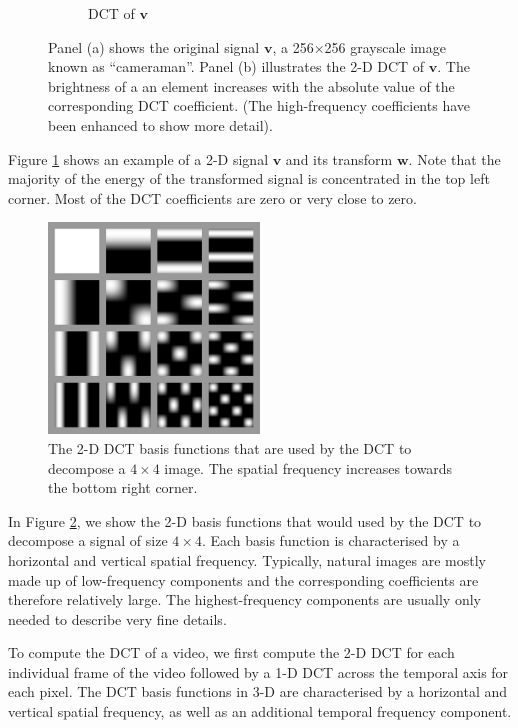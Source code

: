 \begin{figure}
\begin{subfigure}{0.45\textwidth}
    \caption{DCT of $\bm v$}
  \end{subfigure}
  \caption[Two-dimensional DCT applied to a digital image]{Panel (a) shows the original signal $\bm v$, a 256$\times$256 grayscale image known as ``cameraman''. Panel (b) illustrates the 2-D DCT of $\bm v$. The brightness of a an element increases with the absolute value of the corresponding DCT coefficient. (The high-frequency coefficients have been enhanced to show more detail).}
  \label{fig:ch3:dct}
\end{figure}

Figure \ref{fig:ch3:dct} shows an example of a 2-D signal $\bm v$ and its transform $\bm w$.
Note that the majority of the energy of the transformed signal is concentrated in the top left corner.
Most of the DCT coefficients are zero or very close to zero.

\begin{figure}
  \centering
  \includegraphics[width=0.5\textwidth]{Chapter3/Images/dct2functions.png}
  \caption[The 2-D DCT basis functions]{The 2-D DCT basis functions that are used by the DCT to decompose a $4\times 4$ image. 
    The spatial frequency increases towards the bottom right corner.}
  \label{fig:2D-DCT}
\end{figure}

In Figure \ref{fig:2D-DCT}, we show the 2-D basis functions that would used by the DCT to decompose a signal of size $4\times 4$.
Each basis function is characterised by a horizontal and vertical spatial frequency.
Typically, natural images are mostly made up of low-frequency components and the corresponding coefficients are therefore relatively large.
The highest-frequency components are usually only needed to describe very fine details.

To compute the DCT of a video, we first compute the 2-D DCT for each individual frame of the video followed by a 1-D DCT across the temporal axis for each pixel.
The DCT basis functions in 3-D are characterised by a horizontal and vertical spatial frequency, as well as an additional temporal frequency component.

